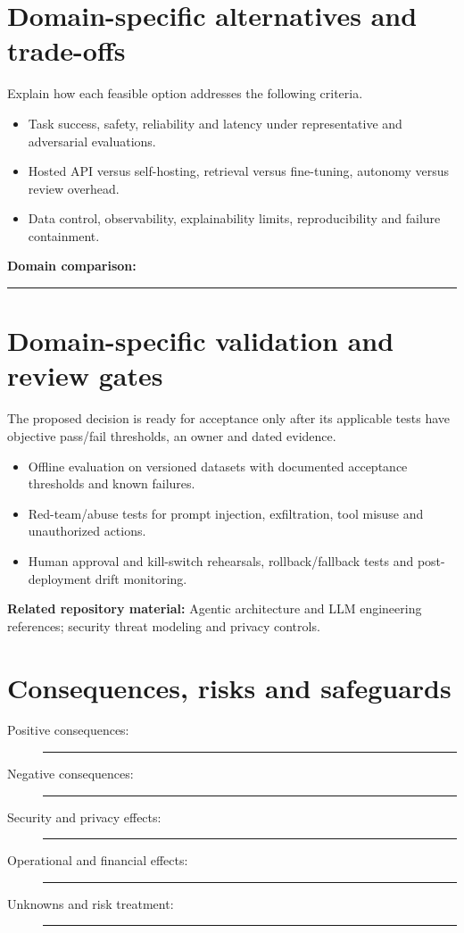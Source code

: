 \documentclass[11pt,letterpaper]{article}
\newcommand{\BlankResponse}{\rule[-0.4em]{0pt}{2em}\rule{0.65\linewidth}{0.4pt}}
\begin{document}
\section{Domain-specific alternatives and trade-offs}
Explain how each feasible option addresses the following criteria.
\begin{itemize}
\item Task success, safety, reliability and latency under representative and adversarial evaluations.
\item Hosted API versus self-hosting, retrieval versus fine-tuning, autonomy versus review overhead.
\item Data control, observability, explainability limits, reproducibility and failure containment.
\end{itemize}
\noindent\textbf{Domain comparison:} \BlankResponse
\section{Domain-specific validation and review gates}
The proposed decision is ready for acceptance only after its applicable
tests have objective pass/fail thresholds, an owner and dated evidence.
\begin{itemize}
\item Offline evaluation on versioned datasets with documented acceptance thresholds and known failures.
\item Red-team/abuse tests for prompt injection, exfiltration, tool misuse and unauthorized actions.
\item Human approval and kill-switch rehearsals, rollback/fallback tests and post-deployment drift monitoring.
\end{itemize}
\noindent\textbf{Related repository material:} Agentic architecture and LLM engineering references; security threat modeling and privacy controls.

\section{Consequences, risks and safeguards}
\begin{description}
\item[Positive consequences:] \BlankResponse
\item[Negative consequences:] \BlankResponse
\item[Security and privacy effects:] \BlankResponse
\item[Operational and financial effects:] \BlankResponse
\item[Unknowns and risk treatment:] \BlankResponse
\end{description}
\end{document}
